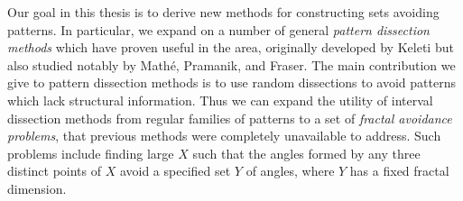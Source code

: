 Our goal in this thesis is to derive new methods for constructing sets avoiding patterns. In particular, we expand on a number of general {\it pattern dissection methods} which have proven useful in the area, originally developed by Keleti but also studied notably by Math\'{e}, Pramanik, and Fraser. The main contribution we give to pattern dissection methods is to use random dissections to avoid patterns which lack structural information. Thus we can expand the utility of interval dissection methods from regular families of patterns to a set of {\it fractal avoidance problems}, that previous methods were completely unavailable to address. Such problems include finding large $X$ such that the angles formed by any three distinct points of $X$ avoid a specified set $Y$ of angles, where $Y$ has a fixed fractal dimension.

\endinput

Any text after an \endinput is ignored.
You could put scraps here or things in progress.